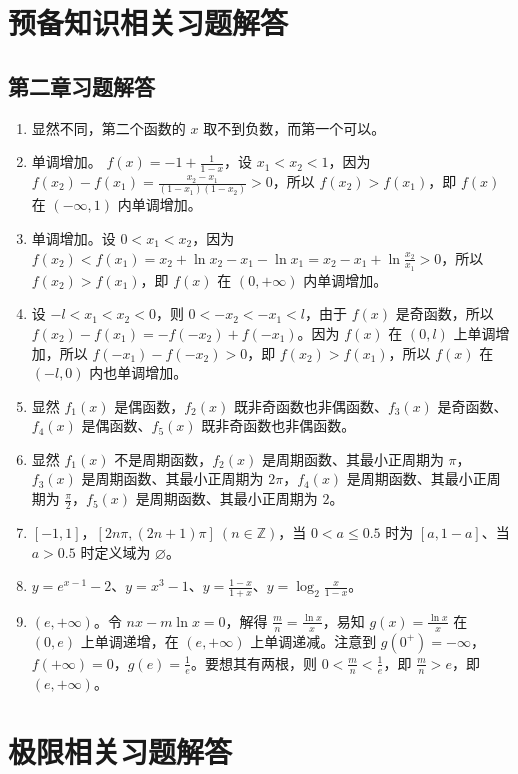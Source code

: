 \documentclass[lang=cn,10pt]{elegantbook}
\begin{document}
\section{预备知识相关习题解答}
\subsection{第二章习题解答}
\begin{enumerate}
\item 显然不同，第二个函数的 $x$ 取不到负数，而第一个可以。
\item 单调增加。 $f(x) = -1 + \frac1{1-x}$，设 $x_1 < x_2 < 1$，因为 $f(x_2) - f(x_1) = \frac{x_2-x_1}{(1-x_1)(1-x_2)} > 0$，所以 $f(x_2) > f(x_1)$，即 $f(x)$ 在 $(-\infty, 1)$ 内单调增加。
\item 单调增加。设 $0 < x_1 < x_2$，因为 $f(x_2) < f(x_1) = x_2 + \ln x_2 - x_1 - \ln x_1 = x_2 - x_1 + \ln \frac{x_2}{x_1} > 0$，所以 $f(x_2) > f(x_1)$，即 $f(x)$ 在 $(0, +\infty)$ 内单调增加。
\item 设 $-l < x_1 < x_2 < 0$，则 $0 < -x_2 < -x_1 < l$，由于 $f(x)$ 是奇函数，所以 $f(x_2) - f(x_1) = -f(-x_2) + f(-x_1)$。因为 $f(x)$ 在 $(0, l)$ 上单调增加，所以 $f(-x_1) - f(-x_2) > 0$，即 $f(x_2) > f(x_1)$，所以 $f(x)$ 在 $(-l, 0)$ 内也单调增加。
\item 显然 $f_1(x)$ 是偶函数，$f_2(x)$ 既非奇函数也非偶函数、$f_3(x)$ 是奇函数、$f_4(x)$ 是偶函数、$f_5(x)$ 既非奇函数也非偶函数。
\item 显然 $f_1(x)$ 不是周期函数，$f_2(x)$ 是周期函数、其最小正周期为 $\pi$，$f_3(x)$ 是周期函数、其最小正周期为 $2\pi$，$f_4(x)$ 是周期函数、其最小正周期为 $\frac{\pi}2$，$f_5(x)$ 是周期函数、其最小正周期为 $2$。
\item $[-1, 1]$，$[2n \pi, (2n+1) \pi]\ (n \in \mathbb{Z})$，当 $0 < a \leq 0.5$ 时为 $[a, 1-a]$、当 $a > 0.5$ 时定义域为 $\varnothing$。
\item $y = e^{x-1}-2$、$y=x^3-1$、$y=\frac{1-x}{1+x}$、$y = \log_2 \frac{x}{1-x}$。
\item $(e, +\infty)$。令 $nx - m \ln x = 0$，解得 $\frac m n = \frac{\ln x}x$，易知 $g(x) = \frac{\ln x}{x}$ 在 $(0, e)$ 上单调递增，在 $(e, +\infty)$ 上单调递减。注意到 $g(0^+) = -\infty$，$f(+\infty) = 0$，$g(e) = \frac 1e$。要想其有两根，则 $0 < \frac m n < \frac 1e$，即 $\frac m n > e$，即 $(e, +\infty)$。
\end{enumerate}

\section{极限相关习题解答}
\end{document}
